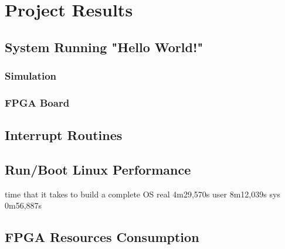 \chapter{Project Results}

\section{System Running "Hello World!"}
\subsection{Simulation}
\subsection{FPGA Board}

\section{Interrupt Routines}

\section{Run/Boot Linux Performance}

time that it takes to build a complete OS
real	4m29,570s
user	8m12,039s
sys	0m56,887s

\section{FPGA Resources Consumption}
